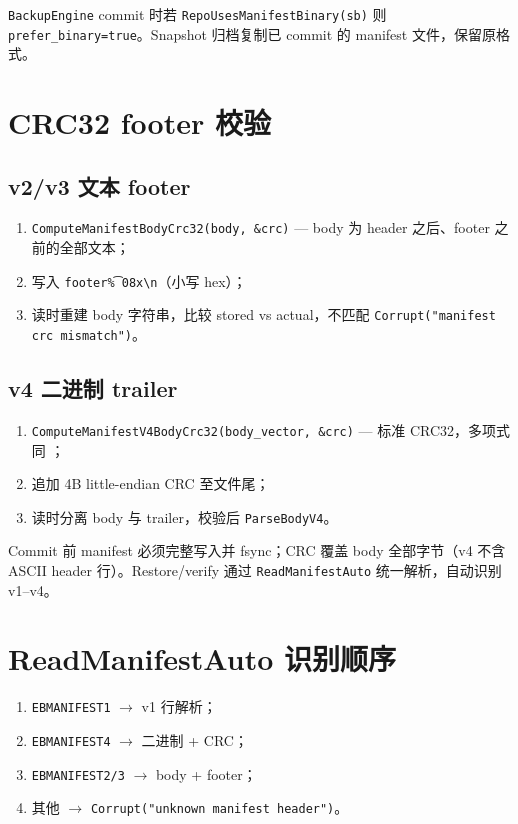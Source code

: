 \texttt{BackupEngine} commit 时若 \texttt{RepoUsesManifestBinary(sb)} 则 \texttt{prefer\_binary=true}。Snapshot 归档复制已 commit 的 manifest 文件，保留原格式。

\section{CRC32 footer 校验}

\subsection{v2/v3 文本 footer}

\begin{enumerate}[nosep]
  \item \texttt{ComputeManifestBodyCrc32(body, \&crc)} — body 为 header 之后、footer 之前的全部文本；
  \item 写入 \texttt{footer\t\%08x\textbackslash n}（小写 hex）；
  \item 读时重建 body 字符串，比较 stored vs actual，不匹配 \texttt{Corrupt("manifest crc mismatch")}。
\end{enumerate}

\subsection{v4 二进制 trailer}

\begin{enumerate}[nosep]
  \item \texttt{ComputeManifestV4BodyCrc32(body\_vector, \&crc)} — 标准 CRC32，多项式同 ；
  \item 追加 4B little-endian CRC 至文件尾；
  \item 读时分离 body 与 trailer，校验后 \texttt{ParseBodyV4}。
\end{enumerate}

\begin{invariantbox}
Commit 前 manifest 必须完整写入并 fsync；CRC 覆盖 body 全部字节（v4 不含 ASCII header 行）。Restore/verify 通过 \texttt{ReadManifestAuto} 统一解析，自动识别 v1--v4。
\end{invariantbox}

\section{ReadManifestAuto 识别顺序}

\begin{enumerate}[nosep]
  \item \texttt{EBMANIFEST1} $\rightarrow$ v1 行解析；
  \item \texttt{EBMANIFEST4} $\rightarrow$ 二进制 + CRC；
  \item \texttt{EBMANIFEST2/3} $\rightarrow$ body + footer；
  \item 其他 $\rightarrow$ \texttt{Corrupt("unknown manifest header")}。
\end{enumerate}

